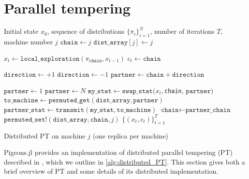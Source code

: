 \section{Parallel tempering}
\label{sec:PT}

\begin{algorithm}[t]
	\begin{algorithmic}[1]
    \Require Initial state $x_0$, sequence of distributions $\{\pi_i\}_{i=1}^N$, 
      number of iterations $T$, machine number $j$
    \State $\texttt{chain} \gets j$ 
    \State $\texttt{dist\_array}[j] \gets j$ 
		
    
     \State $x_t \gets \texttt{local\_exploration}(\pi_\texttt{chain}, x_{t-1})$
    \State $c_t \gets \texttt{chain}$ 
    
		    \State $\texttt{direction} \gets +1$
		  \Else
		    \State $\texttt{direction} \gets -1$
		  \EndIf
		  \State $\texttt{partner} \gets \texttt{chain} + \texttt{direction}$

     
        \State $\texttt{partner} \gets 1$ 
        \State $\texttt{partner} \gets N$
      \EndIf
	    \State $\texttt{my\_stat} \gets \texttt{swap\_stat}(x_t, $\texttt{chain}, $\texttt{partner} )$  
      \State $\texttt{to\_machine} \gets  \texttt{permuted\_get}(\texttt{dist\_array}, \texttt{partner})$
      \State $\texttt{partner\_stat} \gets \texttt{transmit}(\texttt{my\_stat}, \texttt{to\_machine})$
        \State $\texttt{chain} \gets \texttt{partner\_chain}$
      \EndIf
      \State $\texttt{permuted\_set!}(\texttt{dist\_array}, \texttt{chain}, j)$ 
		\EndFor
    \State \Return $\{(x_t, c_t)\}_{t=1}^T$
	\end{algorithmic}
  \caption{Distributed PT on machine $j$ (one replica per machine)}
  \label{alg:distributed_PT}
\end{algorithm}


Pigeons.jl provides an implementation of distributed parallel tempering (PT) described 
in \cite{syed2021nrpt}, which we outline in \cref{alg:distributed_PT}.
This section gives both a brief overview of PT and some details of 
its distributed implementation.


